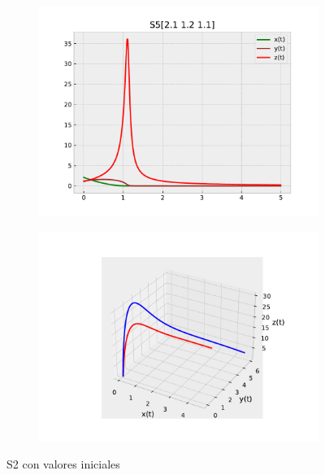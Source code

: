 \documentclass{wscpaperproc}
\theoremstyle{wsc}
\begin{document}
\begin{figure}[h]
	\centering
	\begin{subfigure}[b]{0.5\textwidth}
		\centering
		\includegraphics[width=\textwidth]{Simulations/S5[2.1 1.2 1.1].pdf}
	
		\label{fig:comparativa91}
	\end{subfigure}%
	\begin{subfigure}[b]{0.5\textwidth}
		\centering
		\includegraphics[width=\textwidth]{Simulations/S13d.pdf}
		\label{fig:comparativa92}
	\end{subfigure}
	\caption{S2 con valores iniciales}

	\label{fig:comparacion14}
\end{figure}
\end{document}
